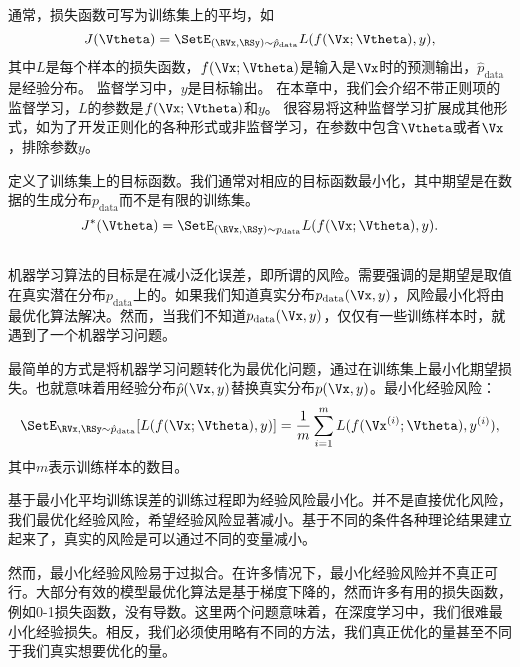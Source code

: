 通常，损失函数可写为训练集上的平均，如
\begin{equation}
\label{eq:8.1}
    J(\Vtheta) = \SetE_{(\RVx, \RSy) \sim\hat{p}_\text{data}} L(f(\Vx ; \Vtheta), y),
\end{equation}
其中$L$是每个样本的损失函数，$f(\Vx;\Vtheta)$是输入是$\Vx$时的预测输出，$\hat{p}_{\text{data}}$是经验分布。
监督学习中，$y$是目标输出。
在本章中，我们会介绍不带正则项的监督学习，$L$的参数是$f(\Vx;\Vtheta)$和$y$。
很容易将这种监督学习扩展成其他形式，如为了开发正则化的各种形式或非监督学习，在参数中包含$\Vtheta$或者$\Vx$，排除参数$y$。

定义了训练集上的目标函数。我们通常对相应的目标函数最小化，其中期望是在数据的生成分布$p_{\text{data}}$而不是有限的训练集。
\begin{equation}
\label{eq:8.2}
    J^*(\Vtheta) = \SetE_{(\RVx, \RSy) \sim p_\text{data}} L(f(\Vx ;\Vtheta),y).
\end{equation}

\subsection{}

机器学习算法的目标是在减小泛化误差，即所谓的风险。需要强调的是期望是取值在真实潜在分布$p_\text{data}$上的。如果我们知道真实分布$p_\text{data}(\Vx, y)$，风险最小化将由最优化算法解决。然而，当我们不知道$p_\text{data}(\Vx, y)$，仅仅有一些训练样本时，就遇到了一个机器学习问题。

最简单的方式是将机器学习问题转化为最优化问题，通过在训练集上最小化期望损失。也就意味着用经验分布$\hat{p}(\Vx,y)$替换真实分布$p(\Vx,y)$。最小化经验风险：
\begin{equation}
\label{eq:8.3}
    \SetE_{\RVx, \RSy \sim \hat{p}_\text{data}} [L(f(\Vx ; \Vtheta), y)]
    = \frac{1}{m} \sum_{i=1}^m L( f(\Vx^{(i)}; \Vtheta), y^{(i)}) ,
\end{equation}
其中$m$表示训练样本的数目。

基于最小化平均训练误差的训练过程即为经验风险最小化。并不是直接优化风险，我们最优化经验风险，希望经验风险显著减小。基于不同的条件各种理论结果建立起来了，真实的风险是可以通过不同的变量减小。

然而，最小化经验风险易于过拟合。在许多情况下，最小化经验风险并不真正可行。大部分有效的模型最优化算法是基于梯度下降的，然而许多有用的损失函数，例如0-1损失函数，没有导数。这里两个问题意味着，在深度学习中，我们很难最小化经验损失。相反，我们必须使用略有不同的方法，我们真正优化的量甚至不同于我们真实想要优化的量。

